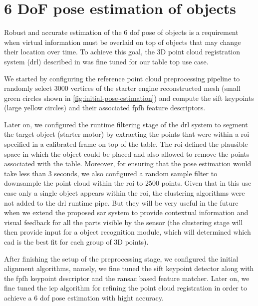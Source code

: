 \section{6 DoF pose estimation of objects}\label{sec:pose-estimation}

Robust and accurate estimation of the 6 \gls{dof} pose of objects is a requirement when virtual information must be overlaid on top of objects that may change their location over time. To achieve this goal, the 3D point cloud registration system (drl) described in \cite{Costa2016} was fine tuned for our table top use case.

We started by configuring the reference point cloud preprocessing pipeline to randomly select 3000 vertices of the starter engine reconstructed mesh (small green circles shown in \cref{fig:initial-pose-estimation}) and compute the \gls{sift} \cite{Lowe2004} keypoints (large yellow circles) and their associated \gls{fpfh} \cite{Rusu2009} feature descriptors.

Later on, we configured the runtime filtering stage of the drl system to segment the target object (starter motor) by extracting the points that were within a \gls{roi} specified in a calibrated frame on top of the table. The \gls{roi} defined the plausible space in which the object could be placed and also allowed to remove the points associated with the table. Moreover, for ensuring that the pose estimation would take less than 3 seconds, we also configured a random sample filter to downsample the point cloud within the \gls{roi} to 2500 points. Given that in this use case only a single object appears within the \gls{roi}, the clustering algorithms were not added to the drl runtime pipe. But they will be very useful in the future when we extend the proposed \gls{sar} system to provide contextual information and visual feedback for all the parts visible by the sensor (the clustering stage will then provide input for a object recognition module, which will determined which \gls{cad} is the best fit for each group of 3D points).

After finishing the setup of the preprocessing stage, we configured the initial alignment algorithms, namely, we fine tuned the \gls{sift} keypoint detector along with the \gls{fpfh} keypoint descriptor and the \gls{ransac} based feature matcher. Later on, we fine tuned the \gls{icp} algorithm for refining the point cloud registration in order to achieve a 6 \gls{dof} pose estimation with hight accuracy.

